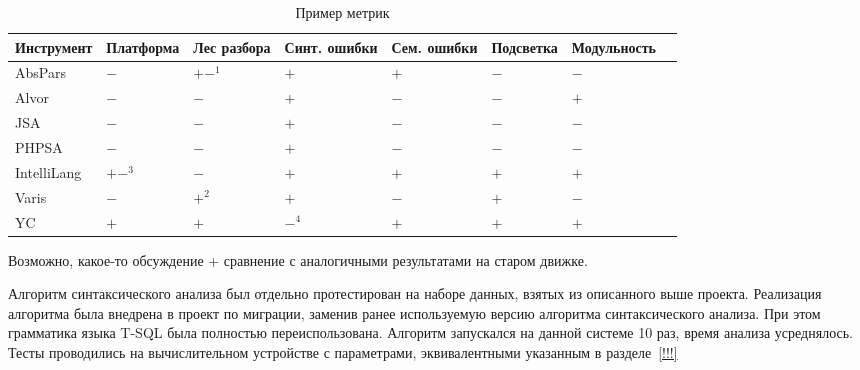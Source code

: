 \begin{table} [htbp]
  \centering
  \parbox{14cm}{\caption{Пример метрик}\label{tbl:metrics}}
  \begin{tabular}{| p{2.6cm} || p{2cm} | p{1.8cm} | p{1.8cm} | p{1.8cm} | p{2cm} | p{2cm}l |}
  \hline                               
  \hline
  \small{Инструмент}   &\centering \small{Платформа} &\centering \small{Лес разбора}      &\centering \small{Синт. ошибки} &\centering \small{Сем. ошибки} &\centering \small{Подсветка} &\centering \small{Модульность} & \\
  \hline 
  AbsPars      &\centering  $-$      &\centering  $+-^1$                 &\centering  $+$                  &\centering  $+$                 &\centering  $-$                 &\centering  $-$        & \\
  Alvor        &\centering  $-$      &\centering  $-$                    &\centering  $+$                  &\centering  $-$                 &\centering  $-$                 &\centering  $+$        &\\
  JSA          &\centering  $-$      &\centering  $-$                    &\centering  $+$                  &\centering  $-$                 &\centering  $-$                 &\centering  $-$        &\\
  PHPSA        &\centering  $-$      &\centering  $-$                    &\centering  $+$                  &\centering  $-$                 &\centering  $-$                 &\centering  $-$        &\\
  IntelliLang  &\centering  $+-^3$   &\centering  $-$                    &\centering  $+$                  &\centering  $+$                 &\centering  $+$                 &\centering  $+$        &\\
  Varis        &\centering  $-$      &\centering  $+^2$                  &\centering  $+$                  &\centering  $-$                 &\centering  $+$                 &\centering  $-$        &\\
  YC           &\centering  $+$      &\centering  $+$                    &\centering  $-^4$                &\centering  $+$                 &\centering  $+$                 &\centering  $+$        &\\
  \hline
  \hline
  \end{tabular}
\end{table}

Возможно, какое-то обсуждение + сравнение с аналогичными результатами на старом движке.

Алгоритм синтаксического анализа был отдельно протестирован на наборе данных, взятых из описанного выше проекта. Реализация алгоритма была внедрена в проект по миграции, заменив ранее используемую версию алгоритма синтаксического анализа. При этом грамматика языка T-SQL была полностью переиспользована. Алгоритм запускался на данной системе 10 раз, время анализа усреднялось. Тесты проводились на вычислительном устройстве с параметрами, эквивалентными указанным в разделе~\ref{!!!}


